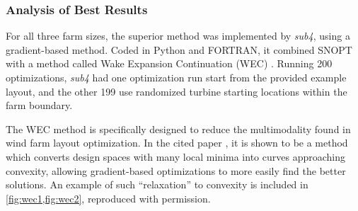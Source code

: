 


\subsubsection{Analysis of Best Results}


	For all three farm sizes, the superior method was implemented by \textit{sub4}, using a gradient-based method.
	Coded in Python and FORTRAN, it combined SNOPT \cite{SNOPT} with a method called Wake Expansion Continuation (WEC) \cite{ThomasNing2018}.
	Running 200 optimizations, \textit{sub4} had one optimization run start from the provided example layout, and the other 199 use randomized turbine starting locations within the farm boundary.

	The WEC method is specifically designed to reduce the multimodality found in wind farm layout optimization.
	In the cited paper \cite{ThomasNing2018}, it is shown to be a method which converts design spaces with many local minima into curves approaching convexity, allowing gradient-based optimizations to more easily find the better solutions.
	An example of such ``relaxation'' to convexity is included in \cref{fig:wec1,fig:wec2}, reproduced with permission.

